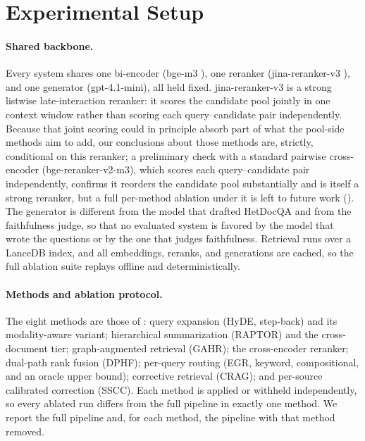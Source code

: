 \documentclass[10pt,twocolumn]{article}
\begin{document}
\section{Experimental Setup}\label{sec:setup}
\paragraph{Shared backbone.}
Every system shares one bi-encoder (bge-m3 \cite{chen2024bgem3}), one
reranker (jina-reranker-v3 \cite{wang2025jinarerankerv3}), and one generator
(gpt-4.1-mini), all held fixed. jina-reranker-v3 is a strong listwise
late-interaction reranker: it scores the candidate pool jointly in one context
window rather than scoring each query--candidate pair independently. Because that
joint scoring could in principle absorb part of what the pool-side methods aim to
add, our conclusions about those methods are, strictly, conditional on this
reranker; a preliminary check with a standard pairwise cross-encoder
(bge-reranker-v2-m3), which scores each query--candidate pair independently,
confirms it reorders the candidate pool substantially and is itself a strong
reranker, but a full per-method ablation under it is left to future work
(). The generator is different from the model that drafted HetDocQA
and from the faithfulness judge, so that no evaluated system is favored by the
model that wrote the questions or by the one that judges faithfulness. Retrieval
runs over a LanceDB index, and all embeddings, reranks, and generations are
cached, so the full ablation suite replays offline and deterministically.

\paragraph{Methods and ablation protocol.}
The eight methods are those of : query expansion
(HyDE, step-back) and its modality-aware variant; hierarchical summarization
(RAPTOR) and the cross-document tier; graph-augmented retrieval (GAHR); the
cross-encoder reranker; dual-path rank fusion (DPHF); per-query routing (EGR,
keyword, compositional, and an oracle upper bound); corrective retrieval (CRAG);
and per-source calibrated correction (SSCC). Each method is applied or withheld
independently, so every ablated run differs from the full pipeline in exactly one
method. We report the full pipeline and, for each method, the pipeline with that
method removed.
\end{document}
